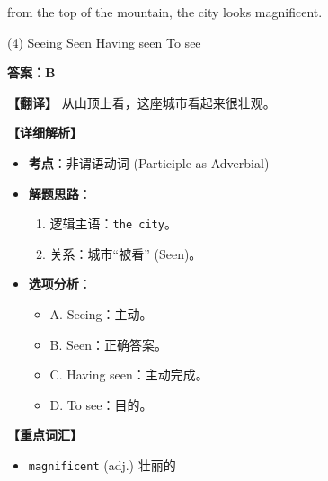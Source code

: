 \documentclass[11pt, a4paper]{article}
\newcommand{\analysis}[4]{
    \begin{solutionbox}
        \textbf{答案：#1}
        
        \textbf{【翻译】} #2
        
        \textbf{【详细解析】}
        #3
        
        \textbf{【重点词汇】}
        #4
    \end{solutionbox}
}
\newcommand{\blank}{\underline{\hspace{1.5cm}}}
\begin{document}
\begin{questions}
    \item \blank from the top of the mountain, the city looks magnificent.
    \begin{tasks}(4)
        \task Seeing \task Seen \task Having seen \task To see
    \end{tasks}
    \analysis{B}{从山顶上看，这座城市看起来很壮观。}{
        \begin{itemize}
            \item \textbf{考点}：非谓语动词 (Participle as Adverbial)
            \item \textbf{解题思路}：
                \begin{enumerate}
                    \item 逻辑主语：\texttt{the city}。
                    \item 关系：城市“被看” (Seen)。
                \end{enumerate}
            \item \textbf{选项分析}：
                \begin{itemize}
                    \item A. Seeing：主动。
                    \item B. Seen：正确答案。
                    \item C. Having seen：主动完成。
                    \item D. To see：目的。
                \end{itemize}
        \end{itemize}
    }{
        \begin{itemize}
            \item \texttt{magnificent} (adj.) 壮丽的
        \end{itemize}
    }


\end{questions}
\end{document}
